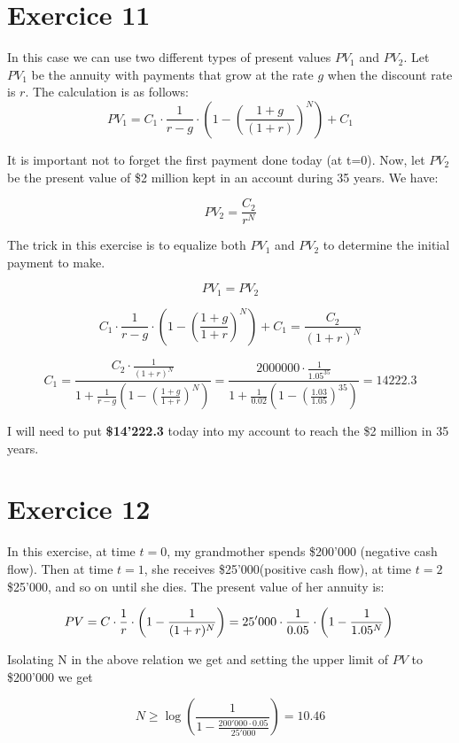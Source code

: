 \documentclass[a4paper,11pt,twoside]{article}
\def \be {\begin{equation}}
\def \ee {\end{equation}}
\begin{document}
\section{Exercice 11}

In this case we can use two different types of present values $PV_1$ and $PV_2$. Let $PV_1$ be the annuity with payments that grow at the rate $g$ when the discount rate is $r$. The calculation is as follows:
\be
PV_1=C_1 \cdot \frac{1}{r-g} \cdot \left(1-\left(\frac{1+g}{(1+r)}\right)^N\right)+C_1
\ee

It is important not to forget the first payment done today (at t=0). Now, let $PV_2$ be the present value of \$2 million kept in an account during 35 years. We have:

\be
PV_2=\frac{C_2}{r^N}
\ee

The trick in this exercise is to equalize both $PV_1$ and $PV_2$ to determine the initial payment to make.

\be
PV_1=PV_2
\ee

\be
C_1 \cdot \frac{1}{r-g} \cdot \left(1-\left(\frac{1+g}{1+r}\right)^N\right)+C_1=\frac{C_2}{(1+r)^N}
\ee

\be
	C_1 = \frac{C_2 \cdot \frac{1}{(1+r)^{N}}}{1 + \frac{1}{r-g} \left( 1 - \left( \frac{1+g}{1+r} \right)^{N} \right)}= \frac{2000000 \cdot \frac{1}{1.05^{35}}}{1 + \frac{1}{0.02} \left( 1 - \left( \frac{1.03}{1.05} \right)^{35} \right)} = 14222.3
\ee

I will need to put \textbf{\$14'222.3} today into my account to reach the \$2 million in 35 years.

\section{Exercice 12}

In this exercise, at time $t=0$, my grandmother spends \$200'000 (negative cash flow). Then at time $t=1$, she receives \$25'000(positive cash flow), at time $t=2$ \$25'000, and so on until she dies. The present value of her annuity is:

\be
PV=C \cdot \frac{1}{r} \cdot \left(1-\frac{1}{(1+r)^N}\right)=25'000 \cdot \frac{1}{0.05} \cdot \left(1-\frac{1}{1.05^N}\right)\\
\ee

Isolating N in the above relation we get and setting the upper limit of $PV$ to \$200'000 we get

\be
N \geq \log \left( \frac{1}{1 - \frac{200'000 \cdot 0.05}{25'000}} \right) = 10.46
\ee
\end{document}
